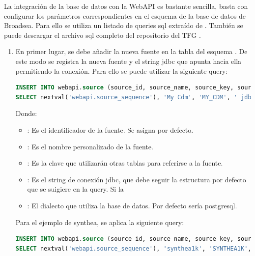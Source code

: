 La integración de la base de datos con la WebAPI es bastante sencilla, basta con configurar los parámetros correspondientes en el esquema  de la base de datos de Broadsea. Para ello se utiliza un listado de queries sql extraído de \parencite{githubCDMConfig}. También se puede descargar el archivo sql completo del repositorio del TFG \parencite{vallealonsodc}.

\begin{enumerate}
    \item En primer lugar, se debe añadir la nueva fuente en la tabla  del esquema . De este modo se registra la nueva fuente y el string jdbc que apunta hacia ella permitiendo la conexión. Para ello se puede utilizar la siguiente query:

\begin{lstlisting}[language=sql]
INSERT INTO webapi.source (source_id, source_name, source_key, source_connection, source_dialect) 
SELECT nextval('webapi.source_sequence'), 'My Cdm', 'MY_CDM', ' jdbc:postgresql://server:5432/cdm?user={user}&password={password}', 'postgresql';
\end{lstlisting}

    Donde:
    \begin{itemize}
        \item {}: Es el identificador de la fuente. Se asigna por defecto.
        \item {}: Es el nombre personalizado de la fuente.
        \item {}: Es la clave que utilizarán otras tablas para referirse a la fuente.
        \item {}: Es el string de conexión jdbc, que debe seguir la estructura por defecto que se suigiere en la query. Si la
        \item {}: El dialecto que utiliza la base de datos. Por defecto sería postgresql.
    \end{itemize}

    Para el ejemplo de synthea, se aplica la siguiente query:

\begin{lstlisting}[language=sql]
INSERT INTO webapi.source (source_id, source_name, source_key, source_connection, source_dialect) 
SELECT nextval('webapi.source_sequence'), 'synthea1k', 'SYNTHEA1K', ' jdbc:postgresql://broadsea-atlasdb:5432/synthea1k?user=postgres&password=mypass', 'postgresql';
\end{lstlisting}


\end{enumerate}
